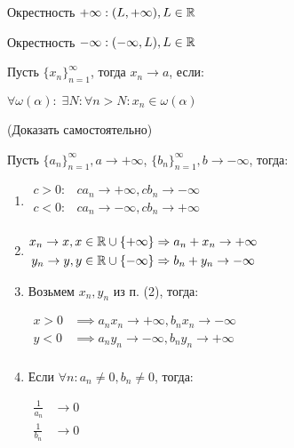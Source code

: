 \begin{definition}
    Окрестность $+\infty: (L, +\infty), L \in \mathbb{R}$

    Окрестность $-\infty: (-\infty, L), L \in \mathbb{R}$
\end{definition}

\begin{definition}
    Пусть $\{x_n\}_{n=1}^{\infty}$, тогда $x_n \to a$, если:

    $\forall \omega(\alpha): \; \exists N: \forall n > N: x_n \in \omega(\alpha)$
\end{definition}


\begin{properties} (Доказать самостоятельно)
    
    Пусть $\{a_n\}_{n=1}^\infty, a \to +\infty$, $\{b_n\}_{n=1}^\infty, b \to -\infty$, тогда:
    \begin{enumerate}
        \item
        $\begin{aligned}
            c > 0: & c a_n \to +\infty, c b_n \to -\infty \\
            c < 0: & c a_n \to  -\infty, c b_n \to +\infty \\
        \end{aligned}$
        \item 
        $\begin{aligned}
            x_n \to x , x \in \mathbb{R} \cup \{+\infty\} &\Rightarrow a_n + x_n \to +\infty \\
            y_n \to y, y \in \mathbb{R} \cup \{-\infty\} &\Rightarrow b_n + y_n \to -\infty \\
        \end{aligned}$
        \item Возьмем $x_n, y_n$ из п. (2), тогда:
        
        $\begin{aligned}
            x > 0 & \implies a_n x_n \to + \infty, b_n x_n \to -\infty \\
            y < 0 & \implies a_n y_n \to -\infty, b_n y_n \to +\infty \\
        \end{aligned}$
        \item Если $\forall n: a_n \neq 0, b_n \neq 0$, тогда:
        
        $\begin{aligned}
            \frac{1}{a_n} & \to 0 \\
            \frac{1}{b_n} & \to 0 \\
        \end{aligned}$


\end{enumerate}
\end{properties}
